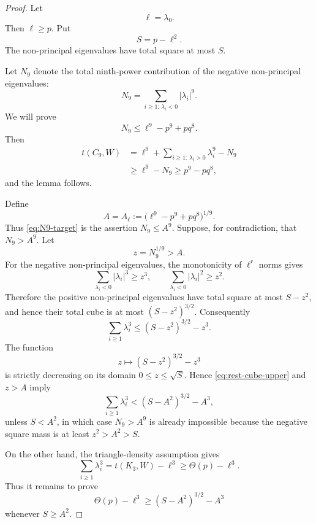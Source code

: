 \documentclass[11pt]{article}
\begin{document}
\begin{proof}
Let
\[
        \ell=\lambda_0.
\]
Then $\ell\ge p$.  Put
\[
        S=p-\ell^2.
\]
The non-principal eigenvalues have total square at most $S$.

Let $N_9$ denote the total ninth-power contribution of the negative non-principal eigenvalues:
\[
        N_9=\sum_{i\ge1:\,\lambda_i<0} |\lambda_i|^9.
\]
We will prove
\begin{equation}\label{eq:N9-target}
        N_9\le \ell^9-p^9+pq^8.
\end{equation}
Then
\[
\begin{aligned}
        t(C_9,W)
        &=\ell^9+
          \sum_{i\ge1:\,\lambda_i>0}\lambda_i^9
          -N_9 \\
        &\ge \ell^9-N_9
        \ge p^9-pq^8,
\end{aligned}
\]
and the lemma follows.

Define
\[
        A=A_\ell:=\bigl(\ell^9-p^9+pq^8\bigr)^{1/9}.
\]
Thus \eqref{eq:N9-target} is the assertion $N_9\le A^9$.
Suppose, for contradiction, that $N_9>A^9$.  Let
\[
        z=N_9^{1/9}>A.
\]
For the negative non-principal eigenvalues, the monotonicity of $\ell^r$ norms gives
\[
        \sum_{\lambda_i<0}|\lambda_i|^3\ge z^3,
        \qquad
        \sum_{\lambda_i<0}|\lambda_i|^2\ge z^2.
\]
Therefore the positive non-principal eigenvalues have total square at most $S-z^2$, and hence their total cube is at most $(S-z^2)^{3/2}$.  Consequently
\begin{equation}\label{eq:rest-cube-upper}
        \sum_{i\ge1}\lambda_i^3
        \le (S-z^2)^{3/2}-z^3.
\end{equation}
The function
\[
        z\mapsto (S-z^2)^{3/2}-z^3
\]
is strictly decreasing on its domain $0\le z\le\sqrt S$.  Hence \eqref{eq:rest-cube-upper} and $z>A$ imply
\begin{equation}\label{eq:rest-cube-contradiction-upper}
        \sum_{i\ge1}\lambda_i^3
        < (S-A^2)^{3/2}-A^3,
\end{equation}
unless $S<A^2$, in which case $N_9>A^9$ is already impossible because the negative square mass is at least $z^2>A^2>S$.

On the other hand, the triangle-density assumption gives
\begin{equation}\label{eq:rest-cube-lower}
        \sum_{i\ge1}\lambda_i^3
        =t(K_3,W)-\ell^3
        \ge \Theta(p)-\ell^3.
\end{equation}
Thus it remains to prove
\begin{equation}\label{eq:key-ell}
        \Theta(p)-\ell^3
        \ge (S-A^2)^{3/2}-A^3
\end{equation}
whenever $S\ge A^2$.


\end{proof}
\end{document}
